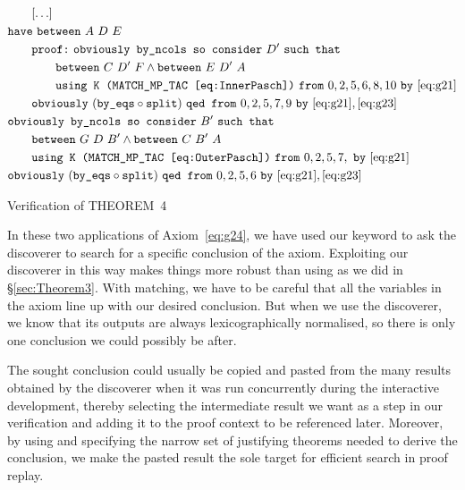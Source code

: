 \begin{boxedfigure}
\begin{align*}
&\qquad[\ldots]\\
&\code{have}\ \between{A}{D}{E}\\
&\qquad \code{proof:}\ \code{obviously by\_ncols so consider}\ D'\ \code{such that}\\
&\qquad\qquad\between{C}{D'}{F}\wedge\between{E}{D'}{A}\\
&\qquad\qquad\code{using K (MATCH\_MP\_TAC \eqref{eq:InnerPasch})}\ \code{from}\ 0,2,5,6,8,10\ \code{by}\ \eqref{eq:g21}\\
&\qquad\code{obviously}\ (\code{by\_eqs}\circ\code{split})\ \code{qed from}\ 0,2,5,7,9\ \code{by}\ \eqref{eq:g21},\eqref{eq:g23}\\
&\code{obviously by\_ncols so consider}\ B'\ \code{such that}\\
&\qquad\between{G}{D}{B'}\wedge\between{C}{B'}{A}\\
&\qquad\code{using K (MATCH\_MP\_TAC \eqref{eq:OuterPasch})}\ \code{from}\ 0,2,5,7,\ \code{by}\ \eqref{eq:g21}\\
&\code{obviously}\ (\code{by\_eqs}\circ\code{split})\ \code{qed from}\ 0,2,5,6\ \code{by}\ \eqref{eq:g21},\eqref{eq:g23}\\
\end{align*}
\caption{Verification of THEOREM~4}
\label{fig:FourVerification}
\end{boxedfigure}\newpage

In these two applications of Axiom~\ref{eq:g24}, we have used our  keyword to ask the  discoverer to search for a specific conclusion of the axiom. Exploiting our discoverer in this way makes things more robust than using  as we did in \S\ref{sec:Theorem3}. With matching, we have to be careful that all the variables in the axiom line up with our desired conclusion. But when we use the discoverer, we know that its outputs are always lexicographically normalised, so there is only one conclusion we could possibly be after.

The sought conclusion could usually be copied and pasted from the many results obtained by the  discoverer when it was run concurrently during the interactive development, thereby selecting the intermediate result we want as a step in our verification and adding it to the proof context to be referenced later. Moreover, by using  and specifying the narrow set of justifying theorems needed to derive the conclusion, we make the pasted result the sole target for efficient search in proof replay.


